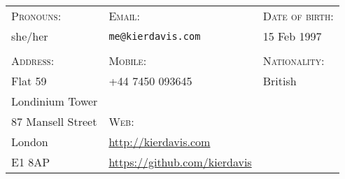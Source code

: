 \vspace{-1em}
\hrulefill
\vspace{1em}

{
  \newcommand{\h}[1]{\textsc{#1}:}
  \newcommand{\n}[1]{\hspace{.8em} #1}
  \begin{tabu} to \textwidth {X[1.4,l] X[2.3,l] X[1.4,l]}
    \h{Pronouns}           & \h{Email}                                 & \h{Date of birth}  \\
    \n{she/her}            & \n{\texttt{me@kierdavis.com}}             & \n{15 Feb 1997}    \\
                           &                                           &                    \\
    \h{Address}            & \h{Mobile}                                & \h{Nationality}    \\
    \n{Flat 59}            & \n{+44 7450 093645}                       & \n{British}        \\
    \n{Londinium Tower}    &                                           &                    \\
    \n{87 Mansell Street}  & \h{Web}                                   &                    \\
    \n{London}             & \n{\url{http://kierdavis.com}}            &                    \\
    \n{E1 8AP}             & \n{\url{https://github.com/kierdavis}}    &                    \\
  \end{tabu}
}

\hrulefill
